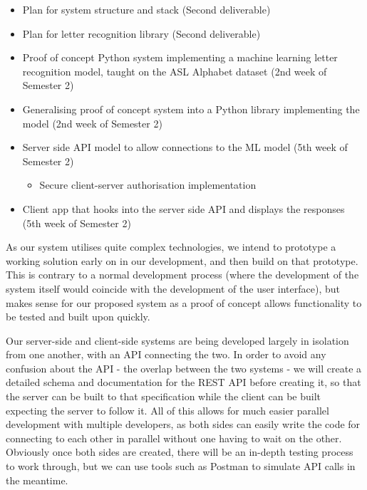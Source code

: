 \documentclass[10pt]{article}
\begin{document}
\begin{itemize}
  \item Plan for system structure and stack (Second deliverable)
  \item Plan for letter recognition library (Second deliverable)
  \item Proof of concept Python system implementing a machine learning letter recognition model, 
    taught on the ASL Alphabet dataset \cite{asldataset} (2nd week of Semester 2)
  \item Generalising proof of concept system into a Python library implementing the model (2nd week 
    of Semester 2)
  \item Server side API model to allow connections to the ML model (5th week of Semester 2)
  \begin{itemize}
    \item Secure client-server authorisation implementation
  \end{itemize}
  \item Client app that hooks into the server side API and displays the responses (5th week of 
    Semester 2)

\end{itemize}

As our system utilises quite complex technologies, we intend to prototype a working solution early 
on in our development, and then build on that prototype. This is contrary to a normal development 
process (where the development of the system itself would coincide with the development of the user 
interface), but makes sense for our proposed system as a proof of concept allows functionality to be 
tested and built upon quickly. 

Our server-side and client-side systems are being developed largely in isolation from one another, 
with an API connecting the two. In order to avoid any confusion about the API - the overlap between 
the two systems -  we will create a detailed schema and documentation for the REST API before 
creating it, so that the server can be built to that specification while the client can be built 
expecting the server to follow it. All of this allows for much easier parallel development with 
multiple developers, as both sides can easily write the code for connecting to each other in 
parallel without one having to wait on the other. Obviously once both sides are created, there will 
be an in-depth testing process to work through, but we can use tools such as Postman to simulate API 
calls in the meantime. 
\end{document}
